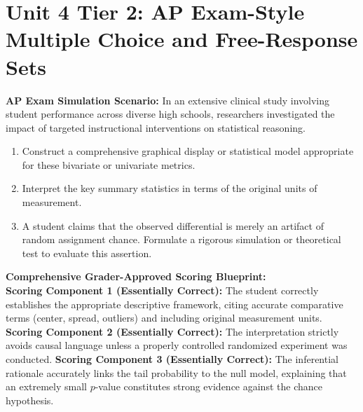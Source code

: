 \section{Unit 4 Tier 2: AP Exam-Style Multiple Choice and Free-Response Sets}
\begin{workbookbox}
\textbf{AP Exam Simulation Scenario:} In an extensive clinical study involving student performance across diverse high schools, researchers investigated the impact of targeted instructional interventions on statistical reasoning.
\begin{enumerate}[label=(\alph*)]
  \item Construct a comprehensive graphical display or statistical model appropriate for these bivariate or univariate metrics.
  \item Interpret the key summary statistics in terms of the original units of measurement.
  \item A student claims that the observed differential is merely an artifact of random assignment chance. Formulate a rigorous simulation or theoretical test to evaluate this assertion.
\end{enumerate}
\textbf{Comprehensive Grader-Approved Scoring Blueprint:}\\
\textbf{Scoring Component 1 (Essentially Correct):} The student correctly establishes the appropriate descriptive framework, citing accurate comparative terms (center, spread, outliers) and including original measurement units.
\textbf{Scoring Component 2 (Essentially Correct):} The interpretation strictly avoids causal language unless a properly controlled randomized experiment was conducted.
\textbf{Scoring Component 3 (Essentially Correct):} The inferential rationale accurately links the tail probability to the null model, explaining that an extremely small $p$-value constitutes strong evidence against the chance hypothesis.
\end{workbookbox}\vspace{6pt}
